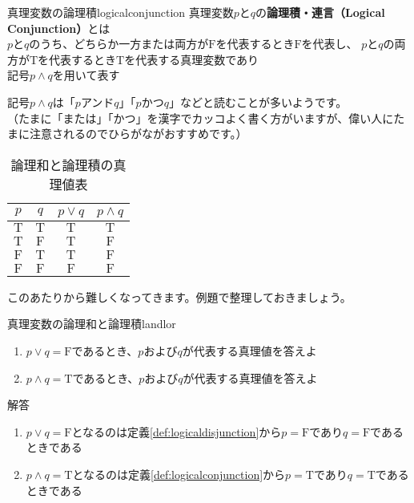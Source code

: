 \documentclass[report]{jlreq}%
\newcounter{myso}
\begin{document}
\begin{mysodef}{真理変数の論理積}{logicalconjunction}
	真理変数$p$と$q$の\textbf{論理積・連言（Logical Conjunction）}とは\\
	$p$と$q$のうち、どちらか一方または両方が$\mathrm{F}$を代表するとき$\mathrm{F}$を代表し、
	$p$と$q$の両方が$\mathrm{T}$を代表するとき$\mathrm{T}$を代表する真理変数であり\\
	記号$p\land{}q$を用いて表す
\end{mysodef}
記号$p\land{}q$は「$p$アンド$q$」「$p$かつ$q$」などと読むことが多いようです。\\
（たまに「または」「かつ」を漢字でカッコよく書く方がいますが、偉い人にたまに注意されるのでひらがながおすすめです。）

\begin{table}[htbp]
	\caption{論理和と論理積の真理値表}
	\label{tb:lorlandtruthtable}
	\centering
	\begin{tabular}{|c|c|c|c|}
		\hline
		$p$ & $q$ & $p\lor{}q$ & $p\land{}q$ \\
		\hline\hline
		$\mathrm{T}$ & $\mathrm{T}$ & $\mathrm{T}$ & $\mathrm{T}$\\
		\hline
		$\mathrm{T}$ & $\mathrm{F}$ & $\mathrm{T}$ & $\mathrm{F}$\\
		\hline
		$\mathrm{F}$ & $\mathrm{T}$ & $\mathrm{T}$ & $\mathrm{F}$\\
		\hline
		$\mathrm{F}$ & $\mathrm{F}$ & $\mathrm{F}$ & $\mathrm{F}$\\
		\hline
	\end{tabular}
\end{table}

このあたりから難しくなってきます。例題で整理しておきましょう。
\begin{mysoegpb}{真理変数の論理和と論理積}{landlor}
\begin{enumerate}
	\item $p\lor{}q=\mathrm{F}$であるとき、$p$および$q$が代表する真理値を答えよ
	\item $p\land{}q=\mathrm{T}$であるとき、$p$および$q$が代表する真理値を答えよ
\end{enumerate}
\tcblower
解答
\begin{enumerate}
	\item $p\lor{}q=\mathrm{F}$となるのは定義\ref*{def:logicaldisjunction}から$p=\mathrm{F}$であり$q=\mathrm{F}$であるときである
	\item $p\land{}q=\mathrm{T}$となるのは定義\ref*{def:logicalconjunction}から$p=\mathrm{T}$であり$q=\mathrm{T}$であるときである
\end{enumerate}
\end{mysoegpb}
\end{document}
